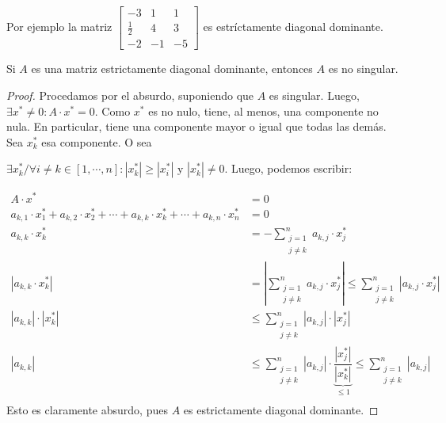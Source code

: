 \documentclass[]{article}
\begin{document}
Por ejemplo la matriz $\begin{bmatrix}
	-3&1&1\\
	\frac{1}{2}&4&3\\
	-2&-1&-5
\end{bmatrix}$ es estríctamente diagonal dominante.

\begin{prop}\label{edd_no_singular}
	Si $A$ es una matriz estrictamente diagonal dominante, entonces $A$ es no singular.
	\begin{proof}
		Procedamos por el absurdo, suponiendo que $A$ es singular. Luego, $\exists x^*\neq0 : A\cdot x^* =0$. Como $x^*$ es no nulo, tiene, al menos, una componente no nula. En particular, tiene una componente mayor o igual que todas las demás. Sea $x_k^*$ esa componente. O sea

		$\exists x^*_k / \forall i\neq k \in [1,\cdots,n] : |x_k^*| \geq |x_i^*| \text{ y } |x_k^*|\neq 0$. Luego, podemos escribir:

		\begin{align*}
			A\cdot x^*&=0\\
			a_{k,1}\cdot x^*_1 + a_{k,2}\cdot x^*_2 + \cdots + a_{k,k}\cdot x^*_k + \cdots + a_{k,n}\cdot x^*_n &= 0\\
			a_{k,k}\cdot x^*_k &= - \sum_{\substack{j=1 \\ j\neq k}}^{n}{a_{k,j}\cdot x^*_{j}}\\
			|a_{k,k}\cdot x^*_k| &= \left|\sum_{\substack{j=1 \\ j\neq k}}^{n}{a_{k,j}\cdot x^*_{j}}\right| \leq \sum_{\substack{j=1 \\ j\neq k}}^{n}{|a_{k,j}\cdot x_j^*|}\\
			|a_{k,k}|\cdot |x^*_k| &\leq\sum_{\substack{j=1 \\ j\neq k}}^{n}{|a_{k,j}|\cdot |x_j^*|}\\
			|a_{k,k}| &\leq\sum_{\substack{j=1 \\ j\neq k}}^{n}{|a_{k,j}|\cdot \underbrace{\dfrac{|x_j^*|}{|x_k^*|}}_{\leq 1}}\leq\sum_{\substack{j=1 \\ j\neq k}}^{n}{|a_{k,j}|}\\
		\end{align*}
		Esto es claramente absurdo, pues $A$ es estrictamente diagonal dominante.
	\end{proof}
\end{prop}
\end{document}
